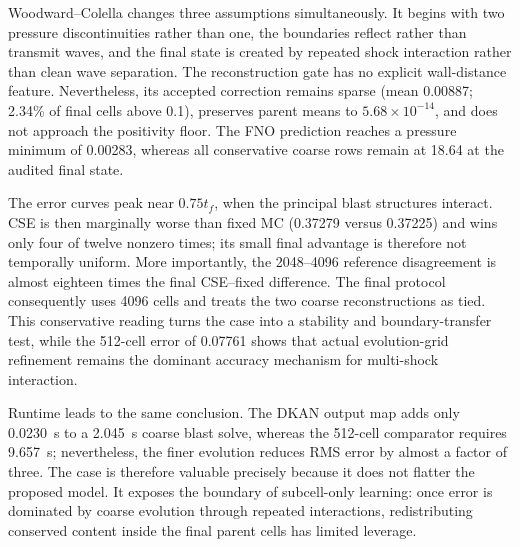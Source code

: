 \documentclass[10pt,twocolumn]{article}
\begin{document}
Woodward--Colella changes three assumptions simultaneously. It begins with two pressure discontinuities rather than one, the boundaries reflect rather than transmit waves, and the final state is created by repeated shock interaction rather than clean wave separation. The reconstruction gate has no explicit wall-distance feature. Nevertheless, its accepted correction remains sparse (mean 0.00887; 2.34\% of final cells above 0.1), preserves parent means to $5.68\times10^{-14}$, and does not approach the positivity floor. The FNO prediction reaches a pressure minimum of 0.00283, whereas all conservative coarse rows remain at 18.64 at the audited final state.

The error curves peak near $0.75t_f$, when the principal blast structures interact. CSE is then marginally worse than fixed MC (0.37279 versus 0.37225) and wins only four of twelve nonzero times; its small final advantage is therefore not temporally uniform. More importantly, the 2048--4096 reference disagreement is almost eighteen times the final CSE--fixed difference. The final protocol consequently uses 4096 cells and treats the two coarse reconstructions as tied. This conservative reading turns the case into a stability and boundary-transfer test, while the 512-cell error of 0.07761 shows that actual evolution-grid refinement remains the dominant accuracy mechanism for multi-shock interaction.

Runtime leads to the same conclusion. The DKAN output map adds only 0.0230~s to a 2.045~s coarse blast solve, whereas the 512-cell comparator requires 9.657~s; nevertheless, the finer evolution reduces RMS error by almost a factor of three. The case is therefore valuable precisely because it does not flatter the proposed model. It exposes the boundary of subcell-only learning: once error is dominated by coarse evolution through repeated interactions, redistributing conserved content inside the final parent cells has limited leverage.
\end{document}
